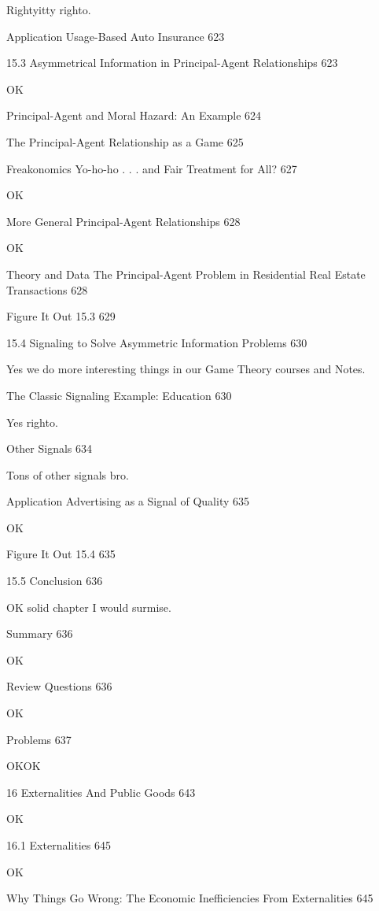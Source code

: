 Rightyitty righto.

Application Usage-Based Auto Insurance 623



15.3 Asymmetrical Information in Principal-Agent Relationships 623

OK

Principal-Agent and Moral Hazard: An Example 624



The Principal-Agent Relationship as a Game 625



Freakonomics Yo-ho-ho . . . and Fair Treatment for All? 627

OK

More General Principal-Agent Relationships 628

OK

Theory and Data The Principal-Agent Problem in Residential Real Estate Transactions 628



Figure It Out 15.3 629



15.4 Signaling to Solve Asymmetric Information Problems 630

Yes we do more interesting things in our Game Theory courses and Notes.

The Classic Signaling Example: Education 630

Yes righto.

Other Signals 634

Tons of other signals bro.

Application Advertising as a Signal of Quality 635

OK

Figure It Out 15.4 635



15.5 Conclusion 636

OK solid chapter I would surmise.

Summary 636

OK

Review Questions 636

OK

Problems 637

OKOK

16 Externalities And Public Goods 643

OK

16.1 Externalities 645

OK

Why Things Go Wrong: The Economic Inefficiencies From Externalities 645

